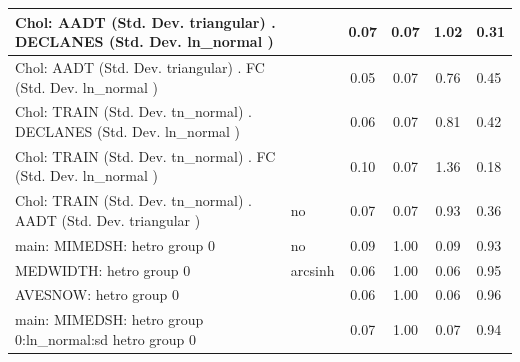 \begin{table}
\begin{center}
\begin{tabular}{|l|l|c|c|c|l|}
			\hline
			 Chol: AADT (Std. Dev. triangular) . DECLANES (Std. Dev.   ln_normal ) &  & 0.07 & 0.07 & 1.02 & 0.31 \\
			\hline
			 Chol: AADT (Std. Dev. triangular) . FC (Std. Dev.   ln_normal ) &  & 0.05 & 0.07 & 0.76 & 0.45 \\
			\hline
			 Chol: TRAIN (Std. Dev. tn_normal) . DECLANES (Std. Dev.   ln_normal ) &  & 0.06 & 0.07 & 0.81 & 0.42 \\
			\hline
			 Chol: TRAIN (Std. Dev. tn_normal) . FC (Std. Dev.   ln_normal ) &  & 0.10 & 0.07 & 1.36 & 0.18 \\
			\hline
			 Chol: TRAIN (Std. Dev. tn_normal) . AADT (Std. Dev.   triangular ) & no & 0.07 & 0.07 & 0.93 & 0.36 \\
			\hline
			main: MIMEDSH: hetro group 0 & no & 0.09 & 1.00 & 0.09 & 0.93 \\
			\hline
			MEDWIDTH: hetro group 0 & arcsinh & 0.06 & 1.00 & 0.06 & 0.95 \\
			\hline
			AVESNOW: hetro group 0 &  & 0.06 & 1.00 & 0.06 & 0.96 \\
			\hline
			main: MIMEDSH: hetro group 0:ln_normal:sd  hetro group 0 &  & 0.07 & 1.00 & 0.07 & 0.94 \\
			\hline
		\end{tabular}
	\end{center}
\end{table}